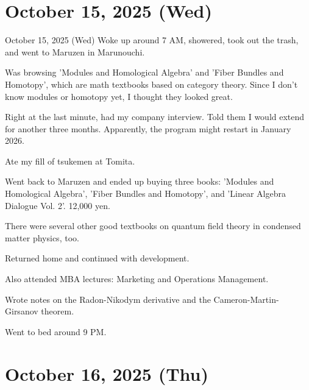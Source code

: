 \documentclass[dvipdfmx, autodetect-engine, aspectratio=169, 10.5pt]{beamer}
\begin{document}
\section{October 15, 2025 (Wed)}

\begin{frame}{October 15, 2025 (Wed)}
\scriptsize
Woke up around 7 AM, showered, took out the trash, and went to Maruzen in Marunouchi.

Was browsing 'Modules and Homological Algebra' and 'Fiber Bundles and Homotopy', which are math textbooks based on category theory. Since I don't know modules or homotopy yet, I thought they looked great.

Right at the last minute, had my company interview.
Told them I would extend for another three months.
Apparently, the program might restart in January 2026.

Ate my fill of tsukemen at Tomita.

Went back to Maruzen and ended up buying three books: 'Modules and Homological Algebra', 'Fiber Bundles and Homotopy', and 'Linear Algebra Dialogue Vol. 2'.
12,000 yen.

There were several other good textbooks on quantum field theory in condensed matter physics, too.

Returned home and continued with development.

Also attended MBA lectures: Marketing and Operations Management.

Wrote notes on the Radon-Nikodym derivative and the Cameron-Martin-Girsanov theorem.

Went to bed around 9 PM.
\end{frame}

\section{October 16, 2025 (Thu)}
\end{document}
